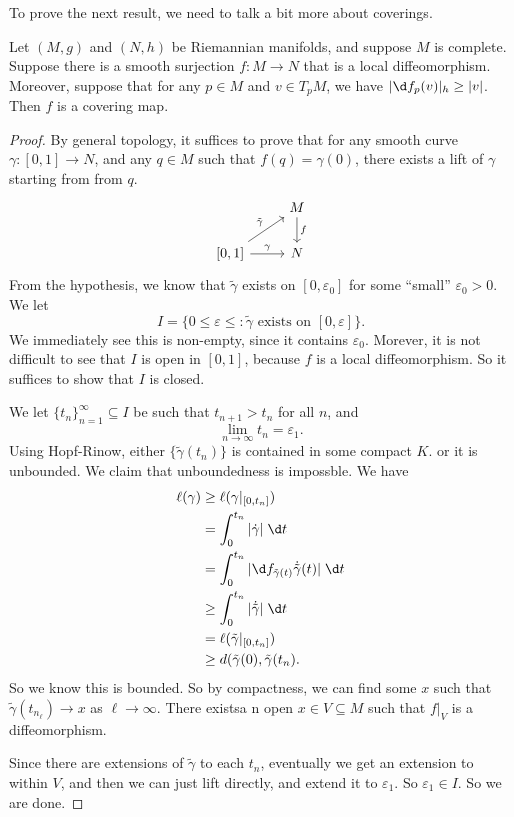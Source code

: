 \documentclass[a4paper]{article}
\begin{document}
To prove the next result, we need to talk a bit more about coverings.
\begin{prop}
  Let $(M, g)$ and $(N, h)$ be Riemannian manifolds, and suppose $M$ is complete. Suppose there is a smooth surjection $f: M \to N$ that is a local diffeomorphism. Moreover, suppose that for any $p \in M$ and $v \in T_p M$, we have $|\d f_p (v)|_h \geq |v|$. Then $f$ is a covering map.
\end{prop}

\begin{proof}
  By general topology, it suffices to prove that for any smooth curve $\gamma: [0, 1] \to N$, and any $q \in M$ such that $f(q) = \gamma(0)$, there exists a lift of $\gamma$ starting from from $q$.
  \[
    \begin{tikzcd}
      & M \ar[d, "f"]\\
      \lbrack 0, 1\rbrack  \ar[r, "\gamma"] \ar[ur, "\tilde{\gamma}"] & N
    \end{tikzcd}
  \]
  From the hypothesis, we know that $\tilde{\gamma}$ exists on $[0, \varepsilon_0]$ for some ``small'' $\varepsilon_0 > 0$. We let
  \[
    I = \{0 \leq \varepsilon \leq : \tilde{\gamma} \text{ exists on }[0, \varepsilon]\}.
  \]
  We immediately see this is non-empty, since it contains $\varepsilon_0$. Morever, it is not difficult to see that $I$ is open in $[0, 1]$, because $f$ is a local diffeomorphism. So it suffices to show that $I$ is closed.

  We let $\{t_n\}_{n = 1}^\infty \subseteq I$ be such that $t_{n + 1} > t_n$ for all $n$, and 
  \[
    \lim_{n \to \infty} t_n = \varepsilon_1.
  \]
  Using Hopf-Rinow, either $\{\tilde{\gamma}(t_n)\}$ is contained in some compact $K$. or it is unbounded. We claim that unboundedness is impossble. We have
  \begin{align*}
    \ell(\gamma) &\geq \ell(\gamma|_{[0, t_n]}) \\
    &= \int_0^{t_n} |\dot{\gamma}|\; \d t\\
    &= \int_0^{t_n} |\d f_{\tilde{\gamma}(t)} \dot{\tilde{\gamma}}(t)|\;\d t\\
    &\geq \int_0^{t_n} |\dot{\tilde{\gamma}}| \;\d t \\
    &= \ell(\tilde{\gamma}|_{[0, t_n]}) \\
    &\geq d(\tilde{\gamma}(0), \tilde{\gamma}(t_n).
  \end{align*}
  So we know this is bounded. So by compactness, we can find some $x$ such that $\tilde{\gamma} (t_{n_\ell}) \to x$ as $\ell \to \infty$. There existsa n open $x \in V \subseteq M$ such that $f|_{V}$ is a diffeomorphism.

  Since there are extensions of $\tilde{\gamma}$ to each $t_n$, eventually we get an extension to within $V$, and then we can just lift directly, and extend it to $\varepsilon_1$. So $\varepsilon_1 \in I$. So we are done.

\end{proof}
\end{document}
